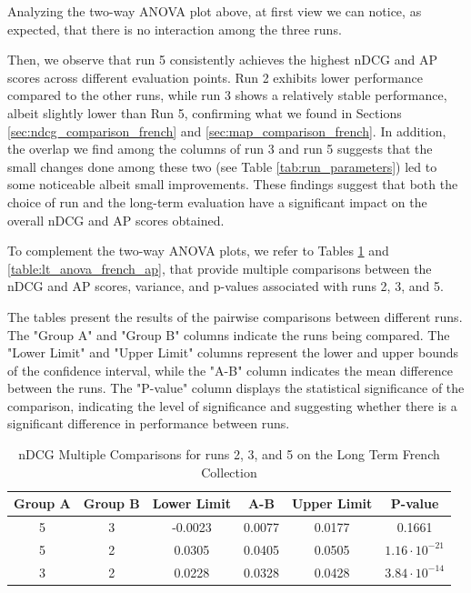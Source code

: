 Analyzing the two-way \ac{ANOVA} plot above, at first view we can notice, as expected, that there is no interaction among the three runs.  

Then, we observe that run 5 consistently achieves the highest \ac{nDCG}  and \ac{AP} scores across different evaluation points. 
Run 2 exhibits lower performance compared to the other runs, while run 3 shows a relatively stable performance, albeit slightly lower than Run 5, confirming what we found in Sections \ref{sec:ndcg_comparison_french} and \ref{sec:map_comparison_french}.
In addition, the overlap we find among the columns of run 3 and run 5 suggests that the small changes done among these two (see Table \ref{tab:run_parameters}) led to some noticeable albeit small improvements. 
These findings suggest that both the choice of run and the long-term evaluation have a significant impact on the overall \ac{nDCG} and \ac{AP} scores obtained.

To complement the two-way \ac{ANOVA} plots, we refer to Tables \ref{table:lt_anova_french} and \ref{table:lt_anova_french_ap}, that provide multiple comparisons between the \ac{nDCG} and \ac{AP} scores, variance, and p-values associated with runs 2, 3, and 5. 

The tables present the results of the pairwise comparisons between different runs. 
The "Group A" and "Group B" columns indicate the runs being compared. 
The "Lower Limit" and "Upper Limit" columns represent the lower and upper bounds of the confidence interval, while the "A-B" column indicates the mean difference between the runs. 
The "P-value" column displays the statistical significance of the comparison, indicating the level of significance and suggesting whether there is a significant difference in performance between runs.

\newpage
\begin{table}[!h]
    \centering
    \caption{\ac{nDCG} Multiple Comparisons for runs 2, 3, and 5 on the Long Term French Collection}
    \label{table:lt_anova_french}
    \begin{tabular}{cccccc}
    \hline
    Group A & Group B & Lower Limit & A-B & Upper Limit & P-value \\ \hline
    5 & 3 & -0.0023 & 0.0077 & 0.0177 & 0.1661 \\
    5 & 2 & 0.0305 & 0.0405 & 0.0505 & $1.16 \cdot 10^{-21}$ \\
    3 & 2 & 0.0228 & 0.0328 & 0.0428 & $3.84 \cdot 10^{-14}$ \\ \hline
    \end{tabular}
\end{table}

